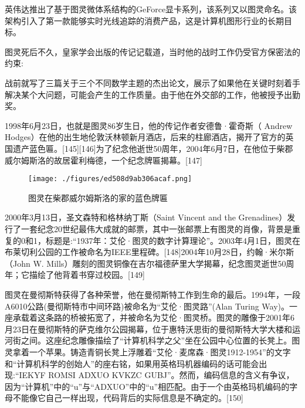 英伟达推出了基于图灵微体系结构的GeForce显卡系列，该系列又以图灵命名。该架构引入了第一款能够实时光线追踪的消费产品，这是计算机图形行业的长期目标。

图灵死后不久，皇家学会出版的传记记载道，当时他的战时工作仍受官方保密法的约束:

战前就写了三篇关于三个不同数学主题的杰出论文，展示了如果他在关键时刻着手解决某个大问题，可能会产生的工作质量。由于他在外交部的工作，他被授予出勤奖。

1998年6月23日，也就是图灵86岁生日，他的传记作者安德鲁·霍奇斯（ Andrew Hodges）在他的出生地伦敦沃林顿新月酒店，后来的柱廊酒店，揭开了官方的英国遗产蓝色匾。[145][146]为了纪念他逝世50周年，2004年6月7日，在他位于柴郡威尔姆斯洛的故居霍利梅德，一个纪念牌匾揭幕。[147]
\begin{figure}[ht]
\centering
\texttt{[image: ./figures/ed508d9ab306acaf.png]}
\caption{图灵在柴郡威尔姆斯洛的家的蓝色牌匾} \label{fig_ALTL_9}
\end{figure}
2000年3月13日，圣文森特和格林纳丁斯（Saint Vincent and the Grenadines）发行了一套纪念20世纪最伟大成就的邮票，其中一张邮票上有图灵的肖像，背景是重复的0和1，标题是:“1937年：艾伦·图灵的数字计算理论”。2003年4月1日，图灵在布莱切利公园的工作被命名为IEEE里程碑。[148]2004年10月28日，约翰·米尔斯（John W. Mills）雕刻的图灵铜像在吉尔福德萨里大学揭幕，纪念图灵逝世50周年；它描绘了他背着书穿过校园。[149]

图灵在曼彻斯特获得了各种荣誉，他在曼彻斯特工作到生命的最后。1994年，一段A6010公路(曼彻斯特市中间环路)被命名为“艾伦·图灵路”(Alan Turing Way)。一座承载着这条路的桥被拓宽了，并被命名为艾伦·图灵桥。图灵的雕像于2001年6月23日在曼彻斯特的萨克维尔公园揭幕，位于惠特沃思街的曼彻斯特大学大楼和运河街之间。这座纪念雕像描绘了“计算机科学之父”坐在公园中心位置的长凳上。图灵拿着一个苹果。铸造青铜长凳上浮雕着“艾伦·麦席森·图灵1912-1954”的文字和“计算机科学的创始人”的座右铭，如果用英格玛机器编码的话可能会出现:“IEKYF ROMSI ADXUO KVKZC GUBJ”。然而，编码信息的含义有争议，因为“计算机”中的“u”与“ADXUO”中的“u”相匹配。由于一个由英格玛机编码的字母不能像它自己一样出现，代码背后的实际信息是不确定的。[150]


